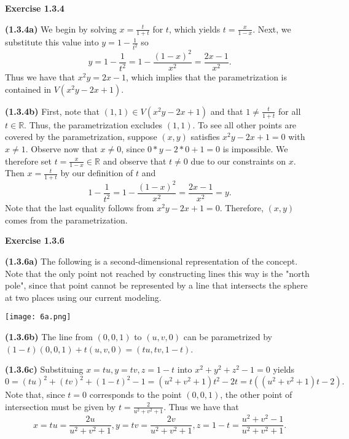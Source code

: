 \documentclass[12pt,oneside]{article}
\newenvironment{exercise}[1]{\vspace{.1in}\noindent\textbf{Exercise #1 \hspace{.05em}}}{}
\newcommand{\R}{\mathbb{R}}
\begin{document}

\begin{exercise}{1.3.4}

    \bigskip
    \textbf{(1.3.4a)}
    We begin by solving $x = \frac{t}{1+t}$ for $t$, which yields $t = \frac{x}{1-x}$. Next,
    we substitute this value into $y = 1 - \frac{1}{t^2}$ so
    \[
        y = 1 - \frac{1}{t^2} = 1 - \frac{(1-x)^2}{x^2} = \frac{2x-1}{x^2}.
    \]
    Thus we have that $x^2y = 2x-1$, which implies that the parametrization is contained in
    $V(x^2y-2x+1)$.
    
    \bigskip
    \textbf{(1.3.4b)}
    First, note that $(1,1) \in V(x^2y-2x+1)$ and that $1 \neq \frac{t}{1+t}$ for all 
    $t \in \R$. Thus, the parametrization excludes $(1,1)$. To see all other points are 
    covered by the parametrization, suppose $(x,y)$ satisfies $x^2y - 2x + 1 = 0$ with 
    $x \neq 1$. Observe now that $x \neq 0$, since $0 * y - 2 * 0 + 1 = 0$ is impossible. 
    We therefore set $t = \frac{x}{1-x} \in \R$ and observe that $t \neq 0$ due to our 
    constraints on $x$. Then $x = \frac{t}{1+t}$ by our definition of $t$ and 
    \[
        1 - \frac{1}{t^2} = 1 - \frac{(1 - x)^2}{x^2} = \frac{2x - 1}{x^2} = y.
    \]
    Note that the last equality follows from $x^2y - 2x + 1 = 0$. Therefore, $(x,y)$ comes 
    from the parametrization.
\end{exercise}


\begin{exercise}{1.3.6}

    \bigskip
    \textbf{(1.3.6a)}
    The following is a second-dimensional representation of the concept. Note that the only 
    point not reached by constructing lines this way is the "north pole", since that point 
    cannot be represented by a line that intersects the sphere at two places using our 
    current modeling.
    
    \texttt{[image: 6a.png]}
    
    \bigskip
    \textbf{(1.3.6b)}
    The line from $(0,0,1)$ to $(u,v,0)$ can be parametrized by 
    $(1-t)(0,0,1) + t(u,v,0) = (tu, tv, 1-t)$. 
    
    \bigskip
    \textbf{(1.3.6c)}
    Substituing $x = tu, y = tv, z =1 - t$ into $x^2 + y^2 + z^2 - 1 = 0$ yields
    \[
        0 = (tu)^2 + (tv)^2 + (1-t)^2 - 1 = (u^2 + v^2 + 1)t^2 - 2t = t((u^2 + v^2 + 1)t - 2).
    \]
    Note that, since $t = 0$ corresponds to the point $(0,0,1)$, the other point of 
    intersection must be given by $t = \frac{2}{u^2+v^2+1}$. Thus we have that 
    \[
        x = tu = \frac{2u}{u^2 + v^2 + 1}, y = tv = \frac{2v}{u^2 + v^2 + 1}, z = 1 - t = \frac{u^2 + v^2 - 1}{u^2 + v^2 + 1}.
    \]
\end{exercise}
\end{document}

